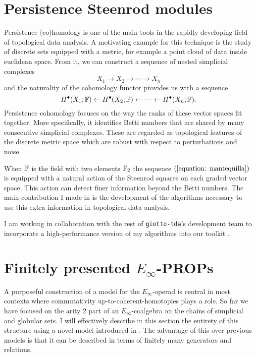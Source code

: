 \section{Persistence Steenrod modules}

Persistence (co)homology is one of the main tools in the rapidly developing field of topological data analysis.
A motivating example for this technique is the study of discrete sets equipped with a metric, for example a point cloud of data inside euclidean space.
From it, we can construct a sequence of nested simplicial complexes
\begin{equation*}
X_1 \to X_2 \to \cdots \to X_n
\end{equation*}
and the naturality of the cohomology functor provides us with a sequence
\begin{equation} \label{equation: mantequilla}
H^\bullet(X_1; \mathbb{F}) \leftarrow H^\bullet(X_2; \mathbb{F}) \leftarrow \cdots \leftarrow H^\bullet(X_n; \mathbb{F}).
\end{equation}
Persistence cohomology focuses on the way the ranks of these vector spaces fit together.
More specifically, it identifies Betti numbers that are shared by many consecutive simplicial complexes.
These are regarded as topological features of the discrete metric space which are robust with respect to perturbations and noise.

When $\mathbb{F}$ is the field with two elements ${\mathbb{F}_2}$ the sequence $(\ref{equation: mantequilla})$ is equipped with a natural action of the Steenrod squares on each graded vector space.
This action can detect finer information beyond the Betti numbers.
The main contribution I made in \cite{medina2018persistence} is the development of the algorithms necessary to use this extra information in topological data analysis.

I am working in collaboration with the rest of \texttt{giotto-tda}'s development team to incorporate a high-performance version of my algorithms into our toolkit \cite{medina2021giotto}.

\section{Finitely presented $E_\infty$-PROPs}

A purposeful construction of a model for the $E_\infty$-operad is central in most contexts where commutativity up-to-coherent-homotopies plays a role.
So far we have focused on the arity 2 part of an $E_\infty$-coalgebra on the chains of simplicial and globular sets.
I will effectively describe in this section the entirety of this structure using a novel model introduced in \cite{medina2020prop1}.
The advantage of this over previous models \cite{berger2004combinatorial, mcclure2003multivariable, kriz1995operads} is that it can be described in terms of finitely many generators and relations.

